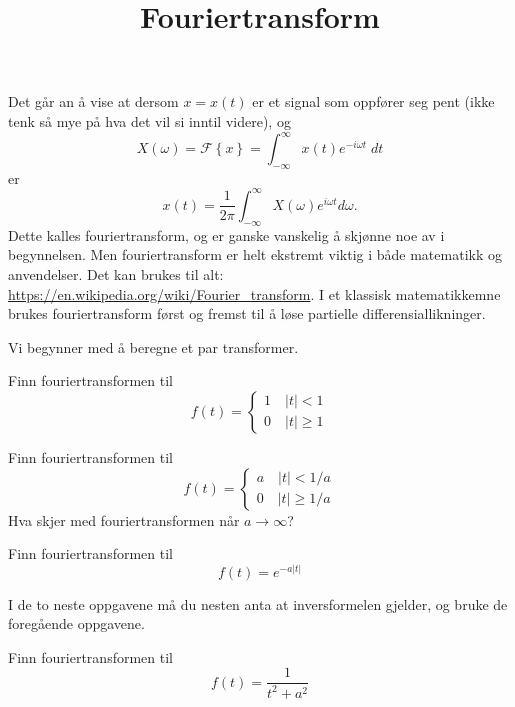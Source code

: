 \title{Fouriertransform}








\maketitle




Det går an å vise at dersom $x=x(t)$ er et signal som oppfører seg pent (ikke tenk så mye på hva det vil si inntil videre), 
og
\[
X(\omega) = \mathcal{F}\left\{ x \right\}=\int_{-\infty}^{\infty} x(t)e^{-i\omega t}\;dt
\]
er
\[
x(t) = \frac{1}{2\pi}\int_{-\infty}^{\infty}X(\omega)e^{i\omega t}d\omega.
\]
Dette kalles fouriertransform, 
og er ganske vanskelig å skjønne noe av i begynnelsen. 
Men fouriertransform er helt ekstremt viktig i både matematikk og anvendelser. 
Det kan brukes til alt: \url{https://en.wikipedia.org/wiki/Fourier_transform}.
I et klassisk matematikkemne brukes fouriertransform først og fremst til å løse partielle differensiallikninger.

Vi begynner med å beregne et par transformer. 

\begin{oppgave}{1}
Finn fouriertransformen til 
\[
f(t)=
\begin{cases} 
1 \quad |t|<1 \\
0 \quad |t|\geq 1
\end{cases}
\]
\end{oppgave}

\begin{oppgave}{2}
Finn fouriertransformen til 
\[
f(t)=
\begin{cases} 
a \quad |t|<1/a \\
0 \quad |t|\geq 1/a
\end{cases}
\]
Hva skjer med fouriertransformen når $a\to \infty$?
\end{oppgave}

\begin{oppgave}{3}
Finn fouriertransformen til
\[
f(t)=e^{-a|t|}
\]
\end{oppgave}

I de to neste oppgavene må du nesten anta at inversformelen gjelder, og bruke de foregående oppgavene.

\begin{oppgave}{4}
Finn fouriertransformen til
\[
f(t)=\frac{1}{t^2+a^2}
\]
\end{oppgave}


